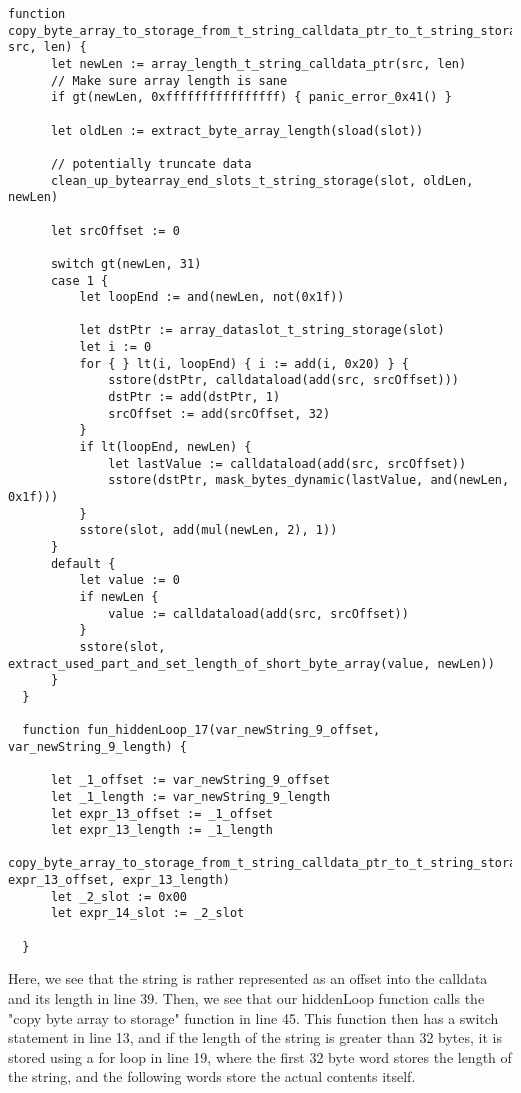 \begin{lstlisting}[language=plantuml, caption={Yul IR that reveals the hidden loop}, label={lst:solcexp}, basicstyle=\ttfamily\scriptsize]
  function copy_byte_array_to_storage_from_t_string_calldata_ptr_to_t_string_storage(slot, src, len) {
      let newLen := array_length_t_string_calldata_ptr(src, len)
      // Make sure array length is sane
      if gt(newLen, 0xffffffffffffffff) { panic_error_0x41() }

      let oldLen := extract_byte_array_length(sload(slot))

      // potentially truncate data
      clean_up_bytearray_end_slots_t_string_storage(slot, oldLen, newLen)

      let srcOffset := 0

      switch gt(newLen, 31)
      case 1 {
          let loopEnd := and(newLen, not(0x1f))

          let dstPtr := array_dataslot_t_string_storage(slot)
          let i := 0
          for { } lt(i, loopEnd) { i := add(i, 0x20) } {
              sstore(dstPtr, calldataload(add(src, srcOffset)))
              dstPtr := add(dstPtr, 1)
              srcOffset := add(srcOffset, 32)
          }
          if lt(loopEnd, newLen) {
              let lastValue := calldataload(add(src, srcOffset))
              sstore(dstPtr, mask_bytes_dynamic(lastValue, and(newLen, 0x1f)))
          }
          sstore(slot, add(mul(newLen, 2), 1))
      }
      default {
          let value := 0
          if newLen {
              value := calldataload(add(src, srcOffset))
          }
          sstore(slot, extract_used_part_and_set_length_of_short_byte_array(value, newLen))
      }
  }

  function fun_hiddenLoop_17(var_newString_9_offset, var_newString_9_length) {

      let _1_offset := var_newString_9_offset
      let _1_length := var_newString_9_length
      let expr_13_offset := _1_offset
      let expr_13_length := _1_length
      copy_byte_array_to_storage_from_t_string_calldata_ptr_to_t_string_storage(0x00, expr_13_offset, expr_13_length)
      let _2_slot := 0x00
      let expr_14_slot := _2_slot

  }
 \end{lstlisting}

 Here, we see that the string is rather represented as an offset into the calldata and its length in line 39.
 Then, we see that our hiddenLoop function calls the "copy byte array to storage" function in line 45.
 This function then has a switch statement in line 13, and if the length of the string is greater than 32 bytes,
 it is stored using a for loop in line 19, where the first 32 byte word stores the length of the string,
 and the following words store the actual contents itself.